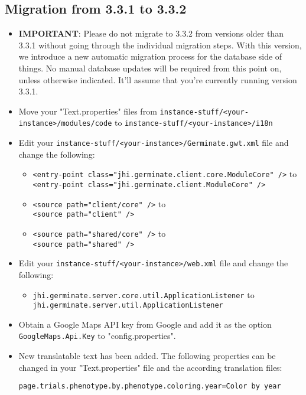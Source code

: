 \subsection{Migration from 3.3.1 to 3.3.2}
\begin{itemize}
	\item \textbf{IMPORTANT}: Please do not migrate to 3.3.2 from versions older than 3.3.1 without going through the individual migration steps. With this version, we introduce a new automatic migration process for the database side of things. No manual database updates will be required from this point on, unless otherwise indicated. It'll assume that you're currently running version 3.3.1.
	\item Move your "Text.properties" files from \texttt{instance-stuff/<your-instance>/modules/code} to \texttt{instance-stuff/<your-instance>/i18n}
	\item Edit your \texttt{instance-stuff/<your-instance>/Germinate.gwt.xml} file and change the following:
	\begin{itemize}
		\item \texttt{<entry-point class="jhi.germinate.client.core.ModuleCore" />} to\\\texttt{<entry-point class="jhi.germinate.client.ModuleCore" />}
		\item \texttt{<source path="client/core" />} to \\\texttt{<source path="client" />}
		\item \texttt{<source path="shared/core" />} to \\\texttt{<source path="shared" />}
	\end{itemize}
	\item Edit your \texttt{instance-stuff/<your-instance>/web.xml} file and change the following:
	\begin{itemize}
		\item \texttt{jhi.germinate.server.core.util.ApplicationListener} to \\\texttt{jhi.germinate.server.util.ApplicationListener}
	\end{itemize}
	\item Obtain a Google Maps API key from Google and add it as the option \texttt{GoogleMaps.Api.Key} to "config.properties".
	\item New translatable text has been added. The following properties can be changed in your "Text.properties" file and the according translation files:
	\begin{lstlisting}[style=Properties]
page.trials.phenotype.by.phenotype.coloring.year=Color by year

\end{lstlisting}
\end{itemize}
